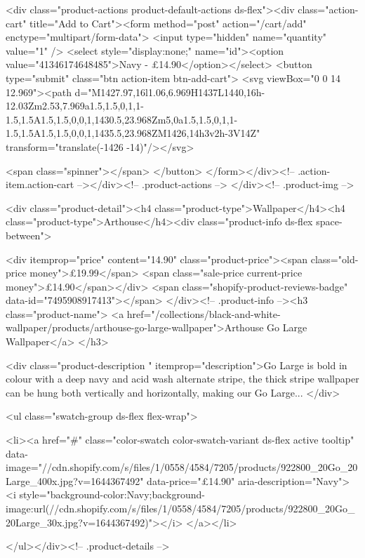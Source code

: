 {{{{{{{<div class="product-actions product-default-actions ds-flex"><div class="action-cart" title="Add to Cart"><form method="post" action="/cart/add" enctype="multipart/form-data">
            <input type="hidden" name="quantity" value="1" />
            <select style="display:none;" name="id"><option value="41346174648485">Navy - £14.90</option></select>
            <button type="submit" class="btn action-item btn-add-cart">
              <svg viewBox="0 0 14 12.969"><path d="M1427.97,16l1.06,6.969H1437L1440,16h-12.03Zm2.53,7.969a1.5,1.5,0,1,1-1.5,1.5A1.5,1.5,0,0,1,1430.5,23.968Zm5,0a1.5,1.5,0,1,1-1.5,1.5A1.5,1.5,0,0,1,1435.5,23.968ZM1426,14h3v2h-3V14Z" transform="translate(-1426 -14)"/></svg>

              <span class="spinner"></span>
            </button>
          </form></div><!-- .action-item.action-cart --></div><!-- .product-actions -->
</div><!-- .product-img -->

<div class="product-detail"><h4 class="product-type">Wallpaper</h4><h4 class="product-type">Arthouse</h4><div class="product-info ds-flex space-between">
    
<div itemprop="price" content="14.90" class="product-price"><span class="old-price money">£19.99</span>
    <span class="sale-price current-price money">£14.90</span></div>
    <span class="shopify-product-reviews-badge" data-id="7495908917413"></span>
  </div><!-- .product-info --><h3 class="product-name">
      <a href="/collections/black-and-white-wallpaper/products/arthouse-go-large-wallpaper">Arthouse Go Large Wallpaper</a>
    </h3>
    
<div class="product-description " itemprop="description">Go Large is bold in colour with a deep navy and acid wash alternate stripe, the thick stripe wallpaper can be hung both vertically and horizontally, making our Go Large...
</div>



<ul class="swatch-group ds-flex flex-wrap">
        
<li><a href="#" class="color-swatch color-swatch-variant ds-flex active tooltip" data-image="//cdn.shopify.com/s/files/1/0558/4584/7205/products/922800_20Go_20Large_400x.jpg?v=1644367492" data-price="£14.90" aria-description="Navy">
              <i style="background-color:Navy;background-image:url(//cdn.shopify.com/s/files/1/0558/4584/7205/products/922800_20Go_20Large_30x.jpg?v=1644367492)"></i>
            </a></li>

      </ul></div><!-- .product-details -->

}}}}}}}
